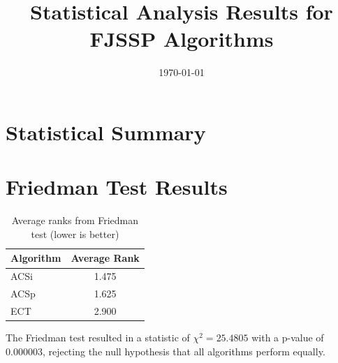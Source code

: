 \documentclass[10pt]{article}
\title{Statistical Analysis Results for FJSSP Algorithms}
\author{}
\date{\today}
\begin{document}
\maketitle

\section*{Statistical Summary}

\section{Friedman Test Results}
\begin{table}[H]
\centering
\caption{Average ranks from Friedman test (lower is better)}
\label{tab:friedman}
\begin{tabular}{lc}
\toprule
Algorithm & Average Rank \\
\midrule
ACSi & 1.475 \\
ACSp & 1.625 \\
ECT & 2.900 \\
\bottomrule
\end{tabular}
\end{table}

The Friedman test resulted in a statistic of $\chi^2 = 25.4805$ with a p-value of 0.000003, rejecting the null hypothesis that all algorithms perform equally.
\end{document}
